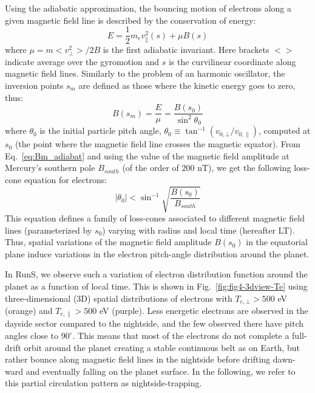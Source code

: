 \documentclass{aa}
\begin{document}
Using the adiabatic approximation, the bouncing motion of electrons along a given magnetic field line is described by the conservation of energy:
\begin{equation}\label{eq:energy_adiabat}
	E = \frac{1}{2}m_e v^2_{\parallel}(s) + \mu B(s) 
\end{equation}
where $\mu=m<v^2_\bot>/2B$ is the first adiabatic invariant. Here brackets $<>$ indicate average over the gyromotion and $s$ is the curvilinear coordinate along magnetic field lines. Similarly to the problem of an harmonic oscillator, the inversion points $s_m$ are defined as those where the kinetic energy goes to zero, thus:
\begin{equation}\label{eq:Bm_adiabat}
	B(s_m)= \frac{E}{\mu} = \frac{B(s_0)}{\sin^2 \theta_0}
\end{equation}
where $\theta_0$ is the initial particle pitch angle, $\theta_0 \equiv \tan^{-1} (v_{0,\bot} / v_{0,\parallel})$, computed at $s_0$ (the point where the magnetic field line crosses the magnetic equator). From Eq.~\ref{eq:Bm_adiabat} and using the value of the magnetic field amplitude at Mercury's southern pole $B_{south}$ (of the order of 200 nT), we get the following loss-cone equation for electrons:
\begin{equation}\label{eq:loss-cone_adiabat}
|\theta_0| < \sin^{-1} \sqrt{ \frac{B(s_0)}{B_{south}} }
\end{equation}
This equation defines a family of loss-cones associated to different magnetic field lines (parameterized by $s_0$) varying with radius and local time (hereafter LT). Thus, spatial variations of the magnetic field amplitude $B(s_0)$ in the equatorial plane induce variations in the electron pitch-angle distribution around the planet.

In RunS, we observe such a variation of electron distribution function around the planet as a function of local time. This is shown in Fig.~\ref{fig:fig4-3dview-Te} using three-dimensional (3D) spatial distributions of electrons with $T_{e,\bot}>500$ eV (orange) and $T_{e,\parallel}>500$ eV (purple). Less energetic electrons are observed in the dayside sector compared to the nightside, and the few observed there have pitch angles close to $90^{\circ}$. This means that most of the electrons do not complete a full-drift orbit around the planet creating a stable continuous belt as on Earth, but rather bounce along magnetic field lines in the nightside before drifting dawn-ward and eventually falling on the planet surface. In the following, we refer to this partial circulation pattern as nightside-trapping.
\end{document}
